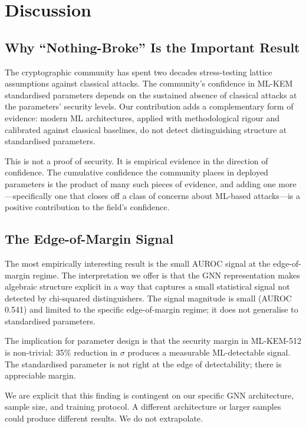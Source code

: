 \documentclass[sigconf,nonacm]{acmart}
\begin{document}
\section{Discussion}

\subsection{Why ``Nothing-Broke'' Is the Important Result}

The cryptographic community has spent two decades stress-testing
lattice assumptions against classical attacks. The community's
confidence in ML-KEM standardised parameters depends on the
sustained absence of classical attacks at the parameters' security
levels. Our contribution adds a complementary form of evidence:
modern ML architectures, applied with methodological rigour and
calibrated against classical baselines, do not detect distinguishing
structure at standardised parameters.

This is not a proof of security. It is empirical evidence in the
direction of confidence. The cumulative confidence the community
places in deployed parameters is the product of many such pieces of
evidence, and adding one more---specifically one that closes off a
class of concerns about ML-based attacks---is a positive
contribution to the field's confidence.

\subsection{The Edge-of-Margin Signal}

The most empirically interesting result is the small AUROC signal at
the edge-of-margin regime. The interpretation we offer is that the
GNN representation makes algebraic structure explicit in a way that
captures a small statistical signal not detected by chi-squared
distinguishers. The signal magnitude is small (AUROC 0.541) and
limited to the specific edge-of-margin regime; it does not
generalise to standardised parameters.

The implication for parameter design is that the security margin in
ML-KEM-512 is non-trivial: 35\% reduction in $\sigma$ produces a
measurable ML-detectable signal. The standardised parameter is not
right at the edge of detectability; there is appreciable margin.

We are explicit that this finding is contingent on our specific
GNN architecture, sample size, and training protocol. A different
architecture or larger samples could produce different results. We
do not extrapolate.
\end{document}
